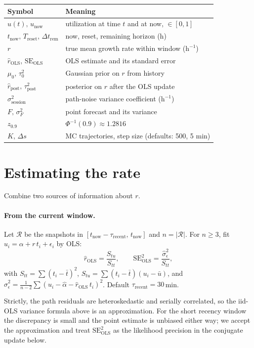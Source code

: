 \documentclass[11pt]{article}
\newcommand{\sighat}{\hat\sigma}
\newcommand{\rpost}{\hat r_{\text{post}}}
\newcommand{\taupostsq}{\tau_{\text{post}}^2}
\newcommand{\tauzerosq}{\tau_0^2}
\newcommand{\rols}{\hat r_{\text{OLS}}}
\newcommand{\seols}{\mathrm{SE}_{\text{OLS}}}
\newcommand{\seolssq}{\mathrm{SE}_{\text{OLS}}^2}
\newcommand{\sigsessionsq}{\sigma_{\text{session}}^2}
\newcommand{\unow}{u_{\text{now}}}
\newcommand{\tnow}{t_{\text{now}}}
\newcommand{\Treset}{T_{\text{reset}}}
\newcommand{\Dtrem}{\Delta t_{\text{rem}}}
\newcommand{\taurecent}{\tau_{\text{recent}}}
\begin{document}
\begin{center}
\begin{tabular}{@{}ll@{}}
\toprule
Symbol & Meaning \\
\midrule
$u(t),\, \unow$              & utilization at time $t$ and at now, $\in [0,1]$ \\
$\tnow,\, \Treset,\, \Dtrem$ & now, reset, remaining horizon (h) \\
$r$                          & true mean growth rate within window ($\mathrm{h}^{-1}$) \\
$\rols,\, \seols$            & OLS estimate and its standard error \\
$\mu_0,\, \tauzerosq$        & Gaussian prior on $r$ from history \\
$\rpost,\, \taupostsq$       & posterior on $r$ after the OLS update \\
$\sigsessionsq$              & path-noise variance coefficient ($\mathrm{h}^{-1}$) \\
$F,\, \sigma_F^2$            & point forecast and its variance \\
$z_{0.9}$                    & $\Phi^{-1}(0.9) \approx 1.2816$ \\
$K,\, \Delta s$              & MC trajectories, step size (defaults: 500, 5 min) \\
\bottomrule
\end{tabular}
\end{center}

\section{Estimating the rate}\label{sec:rate}

Combine two sources of information about $r$.

\paragraph{From the current window.} Let $\mathcal{R}$ be the snapshots in
$[\tnow - \taurecent,\, \tnow]$ and $n = \lvert\mathcal{R}\rvert$. For $n
\geq 3$, fit $u_i = \alpha + r\,t_i + \epsilon_i$ by OLS:
\[
  \rols = \frac{S_{tu}}{S_{tt}},
  \qquad \seolssq = \frac{\sighat_\epsilon^2}{S_{tt}},
\]
with $S_{tt} = \sum (t_i - \bar t)^2$, $S_{tu} = \sum (t_i - \bar t)(u_i -
\bar u)$, and $\sighat_\epsilon^2 = \tfrac{1}{n-2} \sum (u_i - \hat\alpha -
\rols\,t_i)^2$. Default $\taurecent = 30$\,min.

Strictly, the path residuals are heteroskedastic and serially correlated, so
the iid-OLS variance formula above is an approximation. For the short
recency window the discrepancy is small and the point estimate is unbiased
either way; we accept the approximation and treat $\seolssq$ as the
likelihood precision in the conjugate update below.
\end{document}
